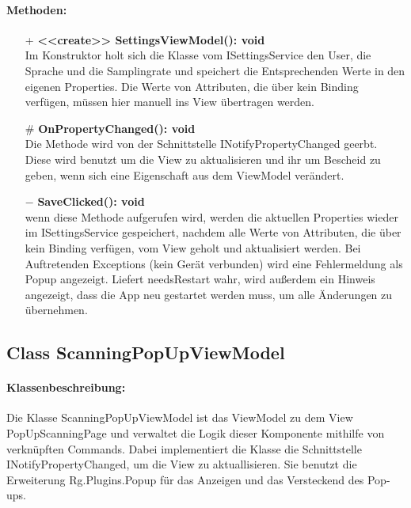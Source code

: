\documentclass[a4paper,12pt]{article}
\begin{document}
\paragraph{Methoden:}
\begin{itemize}
    \item[+] \textbf{<<create>> SettingsViewModel(): void}\\ Im Konstruktor holt sich die Klasse vom ISettingsService den User, die Sprache und die Samplingrate und speichert die Entsprechenden Werte in den eigenen Properties. Die Werte von Attributen, die über kein Binding verfügen, müssen hier manuell ins View übertragen werden.
    \item[\#] \textbf{OnPropertyChanged(): void}\\ Die Methode wird von der Schnittstelle INotifyPropertyChanged geerbt. Diese wird benutzt um die View zu aktualisieren und ihr um Bescheid zu geben, wenn sich eine Eigenschaft aus dem ViewModel verändert. 
    \item[$-$] \textbf{SaveClicked(): void}\\ wenn diese Methode aufgerufen wird, werden die aktuellen Properties wieder im ISettingsService gespeichert, nachdem alle Werte von Attributen, die über kein Binding verfügen, vom View geholt und aktualisiert werden. Bei Auftretenden Exceptions (kein Gerät verbunden) wird eine Fehlermeldung als Popup angezeigt. Liefert needsRestart wahr, wird außerdem ein Hinweis angezeigt, dass die App neu gestartet werden muss, um alle Änderungen zu übernehmen. 
\end{itemize} 

\subsection{Class ScanningPopUpViewModel}
	\paragraph{Klassenbeschreibung:}
	Die Klasse ScanningPopUpViewModel ist das ViewModel zu dem View PopUpScanningPage und verwaltet die Logik dieser Komponente mithilfe von verknüpften Commands. Dabei implementiert die Klasse die Schnittstelle INotifyPropertyChanged, um die View zu aktuallisieren.
	Sie benutzt die Erweiterung \Gls{Rg.Plugins.Popup} für das Anzeigen und das Versteckend des Pop-ups.
	
\end{document}
